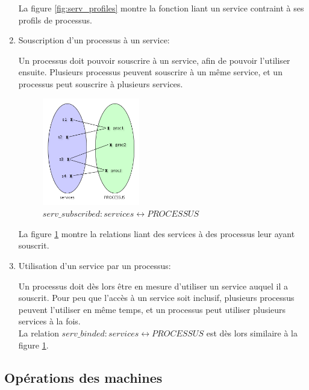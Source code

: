 \documentclass[french, titlepage, 10pt, a4paper]{article}
\begin{document}
\begin{enumerate}
    La figure \ref{fig:serv_profiles} montre la fonction liant un service
    contraint à ses profils de processus.

  \item Souscription d'un processus à un service:

    Un processus doit pouvoir souscrire à un service, afin de pouvoir l'utiliser
    ensuite.
    Plusieurs processus peuvent souscrire à un même service, et un processus
    peut souscrire à plusieurs services.

    \begin{figure}[htb]
      \centering
      \includegraphics[width=0.4\textwidth]{serv_proc.png}
      \caption{$serv\_subscribed: services \leftrightarrow PROCESSUS$}
      \label{fig:serv_subscribed}
    \end{figure}

    La figure \ref{fig:serv_subscribed} montre la relations liant des services
    à des processus leur ayant souscrit.

  \item Utilisation d'un service par un processus:

    Un processus doit dès lors être en mesure d'utiliser un service auquel il a
    souscrit.
    Pour peu que l'accès à un service soit inclusif, plusieurs processus peuvent
    l'utiliser en même temps, et un processus peut utiliser plusieurs services à
    la fois.\\

    La relation $serv\_binded: services \leftrightarrow PROCESSUS$ est
    dès lors similaire à la figure \ref{fig:serv_subscribed}.

\end{enumerate}

\subsection{Opérations des machines}
\end{document}
